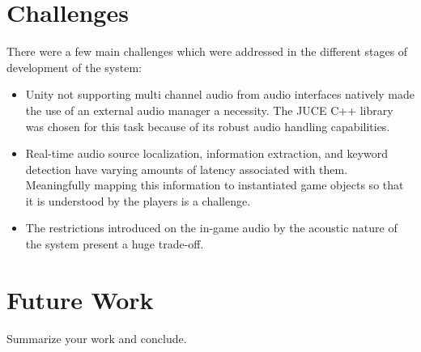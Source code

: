 \documentclass[convention]{aesconf}
\begin{document}
\section{Challenges}
There were a few main challenges which were addressed in the different stages of development of the system: 
\begin{itemize}
\item Unity not supporting multi channel audio from audio interfaces natively made the use of an external audio manager a necessity. The JUCE C++ library was chosen for this task because of its robust audio handling capabilities.
\item Real-time audio source localization, information extraction, and keyword detection have varying amounts of latency associated with them. Meaningfully mapping this information to instantiated game objects so that it is understood by the players is a challenge.
\item The restrictions introduced on the in-game audio by the acoustic nature of the system present a huge trade-off.
\end{itemize}

\section{Future Work} 

Summarize your work and conclude.




\end{document}
